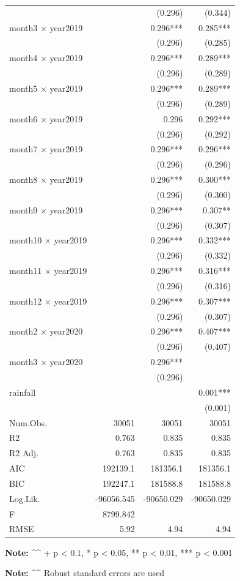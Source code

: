 \documentclass[AEJ]{AEA}
\begin{document}
{\begin{longtable}[]{@{}lrrr@{}}
& & (0.296) & (0.344) \\
month3 × year2019 & & 0.296*** & 0.285*** \\
& & (0.296) & (0.285) \\
month4 × year2019 & & 0.296*** & 0.289*** \\
& & (0.296) & (0.289) \\
month5 × year2019 & & 0.296*** & 0.289*** \\
& & (0.296) & (0.289) \\
month6 × year2019 & & 0.296 & 0.292*** \\
& & (0.296) & (0.292) \\
month7 × year2019 & & 0.296*** & 0.296*** \\
& & (0.296) & (0.296) \\
month8 × year2019 & & 0.296*** & 0.300*** \\
& & (0.296) & (0.300) \\
month9 × year2019 & & 0.296*** & 0.307** \\
& & (0.296) & (0.307) \\
month10 × year2019 & & 0.296*** & 0.332*** \\
& & (0.296) & (0.332) \\
month11 × year2019 & & 0.296*** & 0.316*** \\
& & (0.296) & (0.316) \\
month12 × year2019 & & 0.296*** & 0.307*** \\
& & (0.296) & (0.307) \\
month2 × year2020 & & 0.296*** & 0.407*** \\
& & (0.296) & (0.407) \\
month3 × year2020 & & 0.296*** & \\
& & (0.296) & \\
rainfall & & & 0.001*** \\
& & & (0.001) \\
Num.Obs. & 30051 & 30051 & 30051 \\
R2 & 0.763 & 0.835 & 0.835 \\
R2 Adj. & 0.763 & 0.835 & 0.835 \\
AIC & 192139.1 & 181356.1 & 181356.1 \\
BIC & 192247.1 & 181588.8 & 181588.8 \\
Log.Lik. & -96056.545 & -90650.029 & -90650.029 \\
F & 8799.842 & & \\
RMSE & 5.92 & 4.94 & 4.94 \\
\end{longtable}

\textbf{Note:} \^{}\^{} + p \textless{} 0.1, * p \textless{} 0.05, ** p
\textless{} 0.01, *** p \textless{} 0.001

\textbf{Note:} \^{}\^{} Robust standard errors are used}
\end{document}
